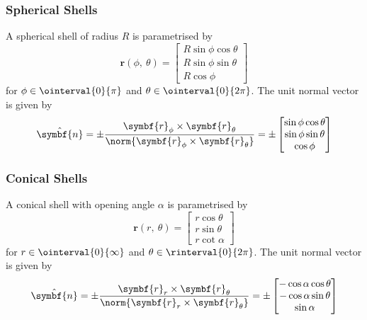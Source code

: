 \documentclass{article}
\begin{document}
\subsubsection{Spherical Shells}
A spherical shell of radius \(R\) is parametrised by
\begin{equation*}
    \symbf{r}\left( \phi,\: \theta \right) =
    \begin{bmatrix}
        R \sin{\phi} \cos{\theta} \\
        R \sin{\phi} \sin{\theta} \\
        R \cos{\phi}
    \end{bmatrix}
\end{equation*}
for \(\phi \in \ointerval{0}{\pi}\) and \(\theta \in \ointerval{0}{2 \pi}\).
The unit normal vector is given by
\begin{equation*}
    \hat{\symbf{n}} = \pm \frac{\symbf{r}_\phi \times \symbf{r}_\theta}{\norm{\symbf{r}_\phi \times \symbf{r}_\theta}} =
    \pm
    \begin{bmatrix}
        \sin{\phi} \cos{\theta} \\
        \sin{\phi} \sin{\theta} \\
        \cos{\phi}
    \end{bmatrix}
\end{equation*}
\subsubsection{Conical Shells}
A conical shell with opening angle \(\alpha\) is parametrised by
\begin{equation*}
    \symbf{r}\left( r,\: \theta \right) =
    \begin{bmatrix}
        r \cos{\theta} \\
        r \sin{\theta} \\
        r \cot{\alpha}
    \end{bmatrix}
\end{equation*}
for \(r \in \ointerval{0}{\infty}\) and \(\theta \in \rinterval{0}{2 \pi}\).
The unit normal vector is given by
\begin{equation*}
    \hat{\symbf{n}} = \pm \frac{\symbf{r}_r \times \symbf{r}_\theta}{\norm{\symbf{r}_r \times \symbf{r}_\theta}} =
    \pm
    \begin{bmatrix}
        -\cos{\alpha} \cos{\theta} \\
        -\cos{\alpha} \sin{\theta} \\
        \sin{\alpha}
    \end{bmatrix}
\end{equation*}
\end{document}
